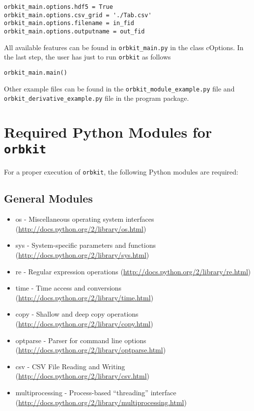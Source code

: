 \documentclass[a4paper,10pt]{scrartcl}
\begin{document}
\begin{verbatim}
orbkit_main.options.hdf5 = True
orbkit_main.options.csv_grid = './Tab.csv'
orbkit_main.options.filename = in_fid
orbkit_main.options.outputname = out_fid
\end{verbatim}
All available features can be found in \verb!orbkit_main.py! in the class cOptions.
In the last step, the user has just to run \texttt{orbkit} as follows

\begin{verbatim}
orbkit_main.main()
\end{verbatim}


Other example files can be found in the \verb!orbkit_module_example.py! file
and \verb!orbkit_derivative_example.py! file in the program package.


\section{Required Python Modules for \texttt{orbkit}}

For a proper execution of \texttt{orbkit}, the following Python modules are
required:


\subsection{General Modules}
\begin{itemize}
\item os - Miscellaneous operating system interfaces (\url{http://docs.python.org/2/library/os.html})
\item sys - System-specific parameters and functions (\url{http://docs.python.org/2/library/sys.html})
\item re - Regular expression operations (\url{http://docs.python.org/2/library/re.html})
\item time - Time access and conversions (\url{http://docs.python.org/2/library/time.html})
\item copy - Shallow and deep copy operations (\url{http://docs.python.org/2/library/copy.html})
\item optparse - Parser for command line options (\url{http://docs.python.org/2/library/optparse.html})
\item csv - CSV File Reading and Writing (\url{http://docs.python.org/2/library/csv.html})
\item multiprocessing - Process-based \textquotedblleft{}threading\textquotedblright{}
interface (\url{http://docs.python.org/2/library/multiprocessing.html})
\end{itemize}
\end{document}
